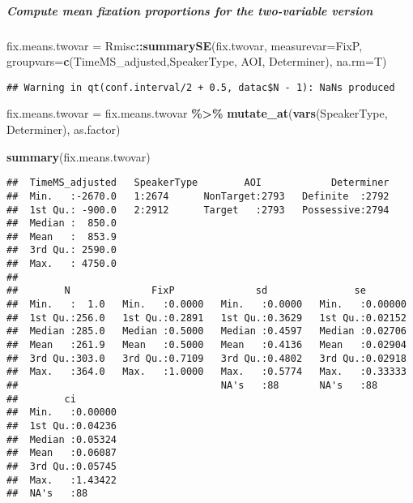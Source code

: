 \documentclass[
]{article}
\newenvironment{Shaded}{\begin{snugshade}}{\end{snugshade}}
\newcommand{\AttributeTok}[1]{\textcolor[rgb]{0.13,0.29,0.53}{#1}}
\newcommand{\FunctionTok}[1]{\textcolor[rgb]{0.13,0.29,0.53}{\textbf{#1}}}
\newcommand{\NormalTok}[1]{#1}
\newcommand{\OtherTok}[1]{\textcolor[rgb]{0.56,0.35,0.01}{#1}}
\newcommand{\SpecialCharTok}[1]{\textcolor[rgb]{0.81,0.36,0.00}{\textbf{#1}}}
\newcommand{\StringTok}[1]{\textcolor[rgb]{0.31,0.60,0.02}{#1}}
\begin{document}
\subparagraph{Compute mean fixation proportions for the two-variable
version}\label{compute-mean-fixation-proportions-for-the-two-variable-version}

\begin{Shaded}
\begin{Highlighting}[]
\NormalTok{fix.means.twovar }\OtherTok{=}\NormalTok{ Rmisc}\SpecialCharTok{::}\FunctionTok{summarySE}\NormalTok{(fix.twovar, }\AttributeTok{measurevar=}\StringTok{\textquotesingle{}FixP\textquotesingle{}}\NormalTok{, }\AttributeTok{groupvars=}\FunctionTok{c}\NormalTok{(}\StringTok{\textquotesingle{}TimeMS\_adjusted\textquotesingle{}}\NormalTok{,}\StringTok{\textquotesingle{}SpeakerType\textquotesingle{}}\NormalTok{, }\StringTok{\textquotesingle{}AOI\textquotesingle{}}\NormalTok{, }\StringTok{\textquotesingle{}Determiner\textquotesingle{}}\NormalTok{), }\AttributeTok{na.rm=}\NormalTok{T)}
\end{Highlighting}
\end{Shaded}

\begin{verbatim}
## Warning in qt(conf.interval/2 + 0.5, datac$N - 1): NaNs produced
\end{verbatim}

\begin{Shaded}
\begin{Highlighting}[]
\NormalTok{fix.means.twovar }\OtherTok{=}\NormalTok{ fix.means.twovar }\SpecialCharTok{\%\textgreater{}\%} \FunctionTok{mutate\_at}\NormalTok{(}\FunctionTok{vars}\NormalTok{(SpeakerType, Determiner), as.factor)}

\FunctionTok{summary}\NormalTok{(fix.means.twovar)}
\end{Highlighting}
\end{Shaded}

\begin{verbatim}
##  TimeMS_adjusted   SpeakerType        AOI            Determiner  
##  Min.   :-2670.0   1:2674      NonTarget:2793   Definite  :2792  
##  1st Qu.: -900.0   2:2912      Target   :2793   Possessive:2794  
##  Median :  850.0                                                 
##  Mean   :  853.9                                                 
##  3rd Qu.: 2590.0                                                 
##  Max.   : 4750.0                                                 
##                                                                  
##        N              FixP              sd               se         
##  Min.   :  1.0   Min.   :0.0000   Min.   :0.0000   Min.   :0.00000  
##  1st Qu.:256.0   1st Qu.:0.2891   1st Qu.:0.3629   1st Qu.:0.02152  
##  Median :285.0   Median :0.5000   Median :0.4597   Median :0.02706  
##  Mean   :261.9   Mean   :0.5000   Mean   :0.4136   Mean   :0.02904  
##  3rd Qu.:303.0   3rd Qu.:0.7109   3rd Qu.:0.4802   3rd Qu.:0.02918  
##  Max.   :364.0   Max.   :1.0000   Max.   :0.5774   Max.   :0.33333  
##                                   NA's   :88       NA's   :88       
##        ci         
##  Min.   :0.00000  
##  1st Qu.:0.04236  
##  Median :0.05324  
##  Mean   :0.06087  
##  3rd Qu.:0.05745  
##  Max.   :1.43422  
##  NA's   :88
\end{verbatim}
\end{document}
